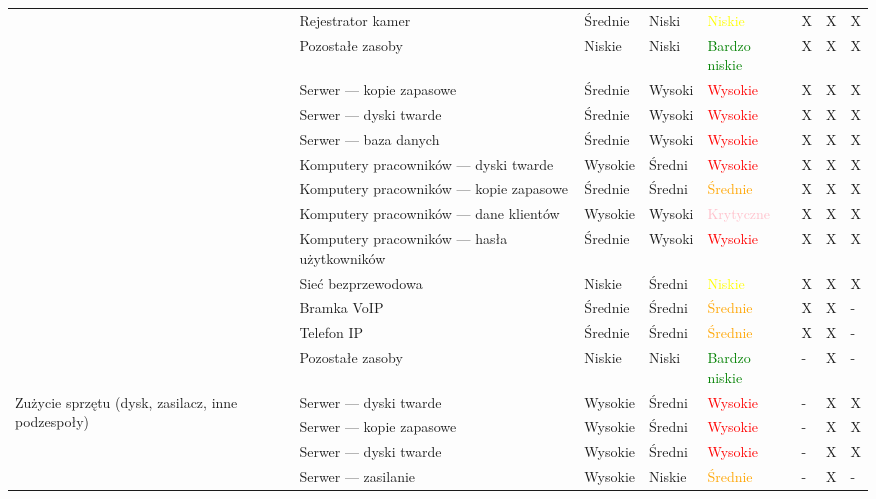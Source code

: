 \begin{landscape}
\begin{longtable}[ht!]{|m{4cm}|m{6cm}|m{4.5cm}|m{2.5cm}|m{2.5cm}|m{0.5cm}|m{0.5cm}|m{0.5cm}|}
		& Rejestrator kamer & Średnie & Niski & \textcolor{yellow}{Niskie} & X & X & X  \\ \cline{2-8}
		& Pozostałe zasoby  & Niskie & Niski & \textcolor{green}{Bardzo niskie} & X & X & X  \\ \cline{2-8}
		\hline 
		\newpage
		\hline
		\multirow{11}{4cm}{Szkodliwe oprogramowanie} 
		& Serwer --- kopie zapasowe & Średnie & Wysoki & \textcolor{red}{Wysokie} & X & X & X  \\ \cline{2-8}
		& Serwer --- dyski twarde & Średnie & Wysoki & \textcolor{red}{Wysokie} & X & X & X  \\ \cline{2-8}
		& Serwer --- baza danych & Średnie & Wysoki & \textcolor{red}{Wysokie} & X & X & X  \\ \cline{2-8}
		& Komputery pracowników --- dyski twarde & Wysokie & Średni & \textcolor{red}{Wysokie} & X & X & X  \\ \cline{2-8}
		& Komputery pracowników --- kopie zapasowe & Średnie & Średni & \textcolor{orange}{Średnie} & X & X & X  \\ \cline{2-8}
		& Komputery pracowników --- dane klientów & Wysokie & Wysoki & \textcolor{pink}{Krytyczne}& X & X & X  \\ \cline{2-8}
		& Komputery pracowników --- hasła użytkowników & Średnie & Wysoki & \textcolor{red}{Wysokie} & X & X & X  \\ \cline{2-8}
		& Sieć bezprzewodowa & Niskie & Średni & \textcolor{yellow}{Niskie} & X & X & X  \\ \cline{2-8}
		& Bramka VoIP & Średnie & Średni & \textcolor{orange}{Średnie} & X & X & - \\ \cline{2-8}
		& Telefon IP & Średnie & Średni & \textcolor{orange}{Średnie} & X & X & - \\ \cline{2-8}
		& Pozostałe zasoby & Niskie & Niski & \textcolor{green}{Bardzo niskie} & - & X & -  \\ \cline{2-8}
		\hline
		\multirow{6}{4cm}{Zużycie sprzętu (dysk, zasilacz, inne podzespoły)}
		& Serwer --- dyski twarde & Wysokie & Średni & \textcolor{red}{Wysokie} & - & X & X  \\ \cline{2-8}
		& Serwer --- kopie zapasowe & Wysokie & Średni & \textcolor{red}{Wysokie} & - & X & X  \\ \cline{2-8}
		& Serwer --- dyski twarde & Wysokie & Średni & \textcolor{red}{Wysokie} & - & X & X  \\ \cline{2-8}
		& Serwer --- zasilanie & Wysokie &Niskie & \textcolor{orange}{Średnie} & - & X & -  \\ \cline{2-8}

\end{longtable}
\end{landscape}
